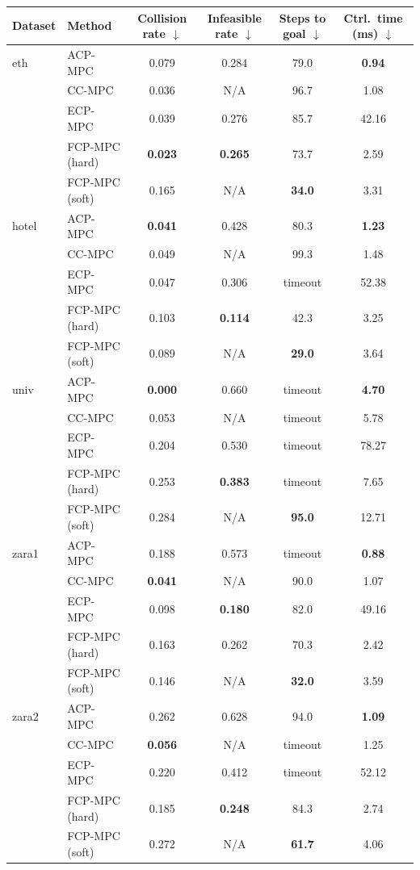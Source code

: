 \begin{tabular}{llcccc}
\hline
Dataset & Method & Collision rate $\downarrow$ & Infeasible rate $\downarrow$ & Steps to goal $\downarrow$ & Ctrl.\ time (ms) $\downarrow$ \\
\hline
eth & ACP-MPC~\cite{dixit2023adaptive} & 0.079 & 0.284 & 79.0 & \textbf{0.94} \\
 & CC-MPC~\cite{lekeufack2024decision} & 0.036 & N/A & 96.7 & 1.08 \\
 & ECP-MPC~\cite{shin2025egocentric} & 0.039 & 0.276 & 85.7 & 42.16 \\
 & FCP-MPC (hard) & \textbf{0.023} & \textbf{0.265} & 73.7 & 2.59 \\
 & FCP-MPC (soft) & 0.165 & N/A & \textbf{34.0} & 3.31 \\
\hline
hotel & ACP-MPC~\cite{dixit2023adaptive} & \textbf{0.041} & 0.428 & 80.3 & \textbf{1.23} \\
 & CC-MPC~\cite{lekeufack2024decision} & 0.049 & N/A & 99.3 & 1.48 \\
 & ECP-MPC~\cite{shin2025egocentric} & 0.047 & 0.306 & timeout & 52.38 \\
 & FCP-MPC (hard) & 0.103 & \textbf{0.114} & 42.3 & 3.25 \\
 & FCP-MPC (soft) & 0.089 & N/A & \textbf{29.0} & 3.64 \\
\hline
univ & ACP-MPC~\cite{dixit2023adaptive} & \textbf{0.000} & 0.660 & timeout & \textbf{4.70} \\
 & CC-MPC~\cite{lekeufack2024decision} & 0.053 & N/A & timeout & 5.78 \\
 & ECP-MPC~\cite{shin2025egocentric} & 0.204 & 0.530 & timeout & 78.27 \\
 & FCP-MPC (hard) & 0.253 & \textbf{0.383} & timeout & 7.65 \\
 & FCP-MPC (soft) & 0.284 & N/A & \textbf{95.0} & 12.71 \\
\hline
zara1 & ACP-MPC~\cite{dixit2023adaptive} & 0.188 & 0.573 & timeout & \textbf{0.88} \\
 & CC-MPC~\cite{lekeufack2024decision} & \textbf{0.041} & N/A & 90.0 & 1.07 \\
 & ECP-MPC~\cite{shin2025egocentric} & 0.098 & \textbf{0.180} & 82.0 & 49.16 \\
 & FCP-MPC (hard) & 0.163 & 0.262 & 70.3 & 2.42 \\
 & FCP-MPC (soft) & 0.146 & N/A & \textbf{32.0} & 3.59 \\
\hline
zara2 & ACP-MPC~\cite{dixit2023adaptive} & 0.262 & 0.628 & 94.0 & \textbf{1.09} \\
 & CC-MPC~\cite{lekeufack2024decision} & \textbf{0.056} & N/A & timeout & 1.25 \\
 & ECP-MPC~\cite{shin2025egocentric} & 0.220 & 0.412 & timeout & 52.12 \\
 & FCP-MPC (hard) & 0.185 & \textbf{0.248} & 84.3 & 2.74 \\
 & FCP-MPC (soft) & 0.272 & N/A & \textbf{61.7} & 4.06 \\
\hline
\end{tabular}